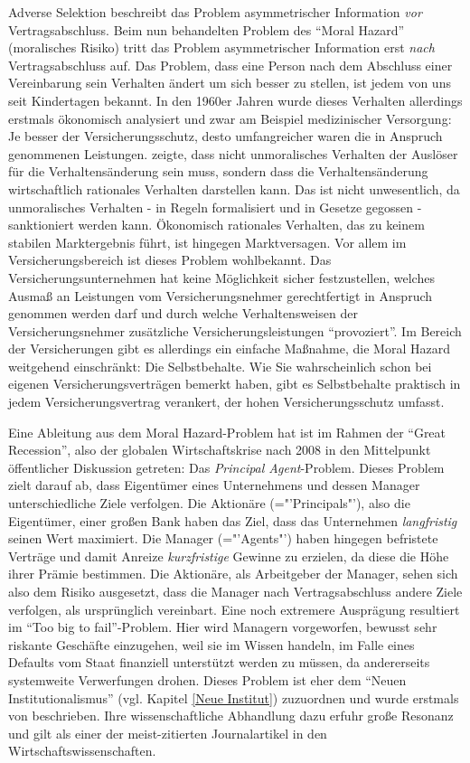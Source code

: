 Adverse Selektion beschreibt das Problem asymmetrischer Information \textit{vor} Vertragsabschluss. Beim nun behandelten Problem des "`Moral Hazard"' (moralisches Risiko) tritt das Problem asymmetrischer Information erst \textit{nach} Vertragsabschluss auf. Das Problem, dass eine Person nach dem Abschluss einer Vereinbarung sein Verhalten ändert um sich besser zu stellen, ist jedem von uns seit Kindertagen bekannt. In den 1960er Jahren wurde dieses Verhalten allerdings erstmals ökonomisch analysiert \parencite{Arrow1963, Dickerson1963} und zwar am Beispiel medizinischer Versorgung: Je besser der Versicherungsschutz, desto umfangreicher waren die in Anspruch genommenen Leistungen. \textcite{Pauly1968} zeigte, dass nicht unmoralisches Verhalten der Auslöser für die Verhaltensänderung sein muss, sondern dass die Verhaltensänderung wirtschaftlich rationales Verhalten darstellen kann. Das ist nicht unwesentlich, da unmoralisches Verhalten - in Regeln formalisiert und in Gesetze gegossen - sanktioniert werden kann. Ökonomisch rationales Verhalten, das zu keinem stabilen Marktergebnis führt, ist hingegen Marktversagen. Vor allem im Versicherungsbereich ist dieses Problem wohlbekannt. Das Versicherungsunternehmen hat keine Möglichkeit sicher festzustellen, welches Ausmaß an Leistungen vom Versicherungsnehmer gerechtfertigt in Anspruch genommen werden darf und durch welche Verhaltensweisen der Versicherungsnehmer zusätzliche Versicherungsleistungen "`provoziert"'. Im Bereich der Versicherungen gibt es allerdings ein einfache Maßnahme, die Moral Hazard weitgehend einschränkt: Die Selbstbehalte. Wie Sie wahrscheinlich schon bei eigenen Versicherungsverträgen bemerkt haben, gibt es Selbstbehalte praktisch in jedem Versicherungsvertrag verankert, der hohen Versicherungsschutz umfasst.

Eine Ableitung aus dem Moral Hazard-Problem hat ist im Rahmen der "`Great Recession"', also der globalen Wirtschaftskrise nach 2008 in den Mittelpunkt öffentlicher Diskussion getreten: Das \textit{Principal Agent}-Problem. Dieses Problem zielt darauf ab, dass Eigentümer eines Unternehmens und dessen Manager unterschiedliche Ziele verfolgen. Die Aktionäre (="'Principals"'), also die Eigentümer, einer großen Bank haben das Ziel, dass das Unternehmen \textit{langfristig} seinen Wert maximiert. Die Manager (="'Agents"') haben hingegen befristete Verträge und damit Anreize \textit{kurzfristige} Gewinne zu erzielen, da diese die Höhe ihrer Prämie bestimmen. Die Aktionäre, als Arbeitgeber der Manager, sehen sich also dem Risiko ausgesetzt, dass die Manager nach Vertragsabschluss andere Ziele verfolgen, als ursprünglich vereinbart. Eine noch extremere Ausprägung resultiert im "`Too big to fail"'-Problem. Hier wird Managern vorgeworfen, bewusst sehr riskante Geschäfte einzugehen, weil sie im Wissen handeln, im Falle eines Defaults vom Staat finanziell unterstützt werden zu müssen, da andererseits systemweite Verwerfungen drohen. Dieses Problem ist eher dem "`Neuen Institutionalismus"' (vgl. Kapitel \ref{Neue Institut}) zuzuordnen und wurde erstmals von \textcite{Jensen1976} beschrieben. Ihre wissenschaftliche Abhandlung dazu erfuhr große Resonanz und gilt als einer der meist-zitierten Journalartikel in den Wirtschaftswissenschaften.

